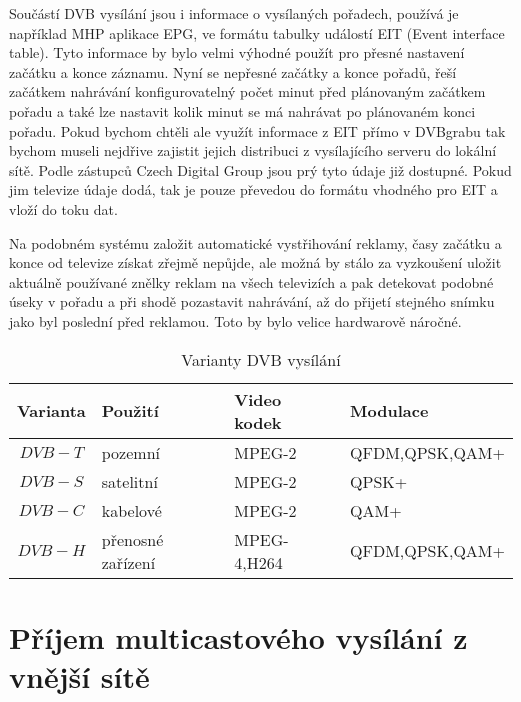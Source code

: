 \vspace{10pt}

Součástí DVB vysílání jsou i informace o vysílaných pořadech, používá je například MHP aplikace EPG, ve formátu tabulky událostí EIT (Event interface table). Tyto informace by bylo velmi výhodné použít pro přesné nastavení začátku a konce záznamu. Nyní se nepřesné začátky a konce pořadů, řeší začátkem nahrávání konfigurovatelný počet minut před plánovaným začátkem pořadu a také lze nastavit kolik minut se má nahrávat po plánovaném konci pořadu. Pokud bychom chtěli ale využít informace z EIT přímo v DVBgrabu tak bychom museli nejdřive zajistit jejich distribuci z vysílajícího serveru do lokální sítě. Podle zástupců Czech Digital Group jsou prý tyto údaje již dostupné. Pokud jim televize údaje dodá, tak je pouze převedou do formátu vhodného pro EIT a vloží do toku dat.

\vspace{10pt}

Na podobném systému založit automatické vystřihování reklamy, časy začátku a konce od televize získat zřejmě nepůjde, ale možná by stálo za vyzkoušení uložit aktuálně používané znělky reklam na všech televizích a pak detekovat podobné úseky v pořadu a při shodě pozastavit nahrávání, až do přijetí stejného snímku jako byl poslední před reklamou. Toto by bylo velice hardwarově náročné.

\vspace{10pt}

\begin{table}
\begin{center}
\begin{tabular}{|c|l|l|l|}
\hline
\bf{Varianta} & \bf{Použití} & \bf{Video kodek} & \bf{Modulace} \\
\hline
$DVB-T$ & pozemní & MPEG-2 & QFDM,QPSK,QAM+\\
\hline
$DVB-S$ & satelitní & MPEG-2 & QPSK+\\
\hline
$DVB-C$ & kabelové & MPEG-2 & QAM+\\
\hline
$DVB-H$ & přenosné zařízení & MPEG-4,H264 & QFDM,QPSK,QAM+\\
\hline
\end{tabular}
\end{center}
\caption{Varianty DVB vysílání}
\label{tab:tab1}
\end{table}

\vspace{10pt}

\section{Příjem multicastového vysílání z vnější sítě}

